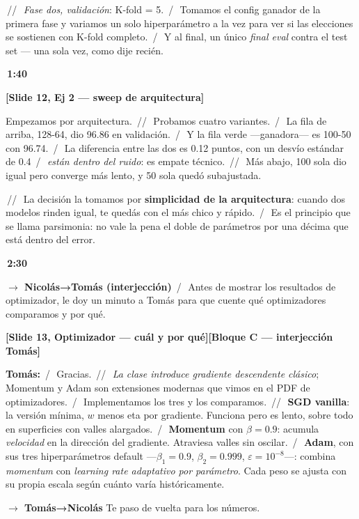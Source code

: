 \documentclass[11pt,a4paper]{article}
\newcommand{\slidenum}[1]{\textcolor{accent}{\textbf{[Slide #1]}}}
\newcommand{\timing}[1]{\textcolor{muted}{\textbf{\,#1\,}}}
\newcommand{\bloque}[1]{\textcolor{muted}{\small\textbf{[Bloque #1]}}}
\newcommand{\enunciado}[1]{\textcolor{warn}{\textit{#1}}}
\newcommand{\pausa}{\textcolor{muted}{\,/\,}}
\newcommand{\Pausa}{\textcolor{muted}{\,/\!/\,}}
\newcommand{\paso}[1]{\textcolor{accent}{\textbf{$\to$ #1}}}
\begin{document}
\Pausa\ \emph{Fase dos, validación}: K-fold = 5. \pausa\ Tomamos el config ganador de la primera fase y variamos un solo hiperparámetro a la vez para ver si las elecciones se sostienen con K-fold completo. \pausa\ Y al final, un único \emph{final eval} contra el test set --- una sola vez, como dije recién.

\timing{1:40}

\slidenum{12, Ej 2 — sweep de arquitectura}

Empezamos por arquitectura. \Pausa\ Probamos cuatro variantes. \pausa\ La fila de arriba, 128-64, dio 96.86 en validación. \pausa\ Y la fila verde ---ganadora--- es 100-50 con 96.74. \pausa\ La diferencia entre las dos es 0.12 puntos, con un desvío estándar de 0.4 \pausa\ \emph{están dentro del ruido}: es empate técnico. \Pausa\ Más abajo, 100 sola dio igual pero converge más lento, y 50 sola quedó subajustada.

\Pausa\ La decisión la tomamos por \textbf{simplicidad de la arquitectura}: cuando dos modelos rinden igual, te quedás con el más chico y rápido. \pausa\ Es el principio que se llama parsimonia: no vale la pena el doble de parámetros por una décima que está dentro del error.

\timing{2:30}

\paso{Nicolás→Tomás (interjección)} \quad \pausa\ Antes de mostrar los resultados de optimizador, le doy un minuto a Tomás para que cuente qué optimizadores comparamos y por qué.

\medskip
\slidenum{13, Optimizador — cuál y por qué}\quad \bloque{C — interjección \textcolor{tomasC}{Tomás}}

\textcolor{tomasC}{\textbf{Tomás:}} \pausa\ Gracias. \Pausa\ \enunciado{La clase introduce gradiente descendente clásico}; Momentum y Adam son extensiones modernas que vimos en el PDF de optimizadores. \pausa\ Implementamos los tres y los comparamos. \Pausa\ \textbf{SGD vanilla}: la versión mínima, $w$ menos eta por gradiente. Funciona pero es lento, sobre todo en superficies con valles alargados. \pausa\ \textbf{Momentum} con $\beta = 0.9$: acumula \emph{velocidad} en la dirección del gradiente. Atraviesa valles sin oscilar. \pausa\ \textbf{Adam}, con sus tres hiperparámetros default ---$\beta_1 = 0.9$, $\beta_2 = 0.999$, $\varepsilon = 10^{-8}$---: combina \emph{momentum} con \emph{learning rate adaptativo por parámetro}. Cada peso se ajusta con su propia escala según cuánto varía históricamente.

\paso{Tomás→Nicolás} \quad Te paso de vuelta para los números.
\end{document}
